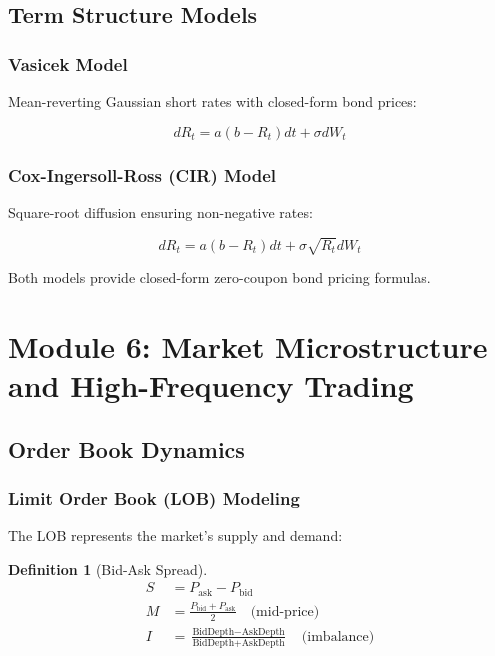 \documentclass[12pt,a4paper]{article}
\newtheorem{definition}{Definition}
\begin{document}
\subsection{Term Structure Models}

\subsubsection{Vasicek Model}

Mean-reverting Gaussian short rates with closed-form bond prices:

\begin{equation}
dR_t = a(b - R_t)dt + \sigma dW_t
\end{equation}

\subsubsection{Cox-Ingersoll-Ross (CIR) Model}

Square-root diffusion ensuring non-negative rates:

\begin{equation}
dR_t = a(b - R_t)dt + \sigma\sqrt{R_t} dW_t
\end{equation}

Both models provide closed-form zero-coupon bond pricing formulas.

\section{Module 6: Market Microstructure and High-Frequency Trading}

\subsection{Order Book Dynamics}

\subsubsection{Limit Order Book (LOB) Modeling}

The LOB represents the market's supply and demand:

\begin{definition}[Bid-Ask Spread]
\begin{align}
S &= P_{\text{ask}} - P_{\text{bid}} \\
M &= \frac{P_{\text{bid}} + P_{\text{ask}}}{2} \quad \text{(mid-price)} \\
I &= \frac{\text{BidDepth} - \text{AskDepth}}{\text{BidDepth} + \text{AskDepth}} \quad \text{(imbalance)}
\end{align}
\end{definition}
\end{document}
